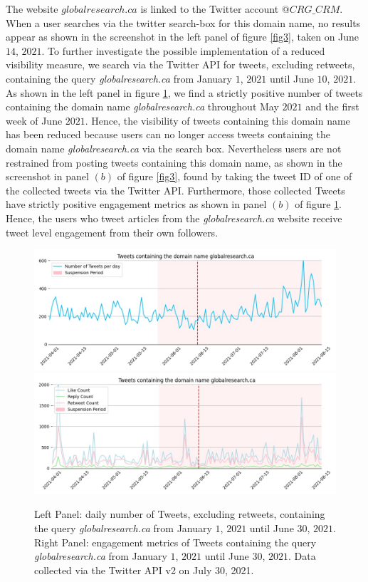 \documentclass{article}
\begin{document}
\smallskip

The website $globalresearch.ca$ is linked to the Twitter account {$@CRG\_CRM$}. When a user searches via the twitter search-box for this domain name, no results appear as shown in the screenshot in the left panel of figure \ref{fig3}, taken on June $14$, $2021$. To further investigate the possible implementation of a reduced visibility measure, we search via the Twitter API for tweets, excluding retweets, containing the query {\it globalresearch.ca} from January $1$, $2021$ until June $10$, $2021$.  As shown in the left panel in figure \ref{fig4}, we find a strictly positive number of tweets containing the domain name {\it globalresearch.ca} throughout May $2021$ and the first week of June $2021$. Hence, the visibility of tweets containing this domain name has been reduced because users can no longer access tweets containing the domain name {\it globalresearch.ca} via the search box. Nevertheless users are not restrained from posting tweets containing this domain name, as shown in the screenshot in panel $(b)$ of figure \ref{fig3}, found by taking the tweet ID of one of the collected tweets via the Twitter API. Furthermore, those collected Tweets have strictly positive engagement metrics as shown in panel $(b)$ of figure \ref{fig4}. Hence, the users who tweet articles from the {\it globalresearch.ca} website receive tweet level engagement from their own followers. 

\begin{figure}[h]
\centering
		\includegraphics[scale=0.27]{../figure/globalresearch_domain_2021-08-17.jpg} 
		\includegraphics[scale=0.27]{../figure/globalresearch_domain_engagement_2021-08-17.jpg}
\caption{Left Panel: daily number of Tweets, excluding retweets, containing the query {\it globalresearch.ca} from January $1$, $2021$ until June $30$, $2021$. Right Panel: engagement metrics of Tweets containing the query {\it globalresearch.ca} from January $1$, $2021$ until June $30$, $2021$. Data collected via the Twitter API v2 on July $30$, 2021.   }
\label{fig4}
\end{figure}
\end{document}
